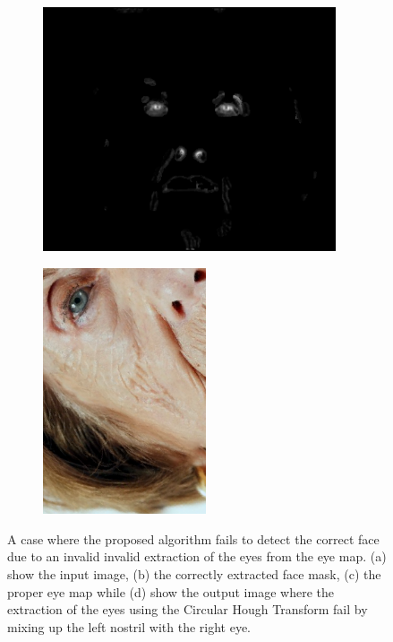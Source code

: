 \begin{figure}[H]
\begin{subfigure}{.25\textwidth}
  \includegraphics[width=0.95\textwidth]{img/fd3/fail1_finalEyeMap.png}
  \caption{}
\end{subfigure}%
\begin{subfigure}{.25\textwidth}
  \centering
  \includegraphics[width=0.53\textwidth]{img/fd3/fail1_output.png}
  \caption{}
\end{subfigure}%

\caption{A case where the proposed algorithm fails to detect the correct face due to an invalid invalid extraction of the eyes from the eye map. (a) show the input image, (b) the correctly extracted face mask, (c) the proper eye map while (d) show the output image where the extraction of the eyes using the Circular Hough Transform fail by mixing up the left nostril with the right eye. }
\label{fig:fail1}
\end{figure}


